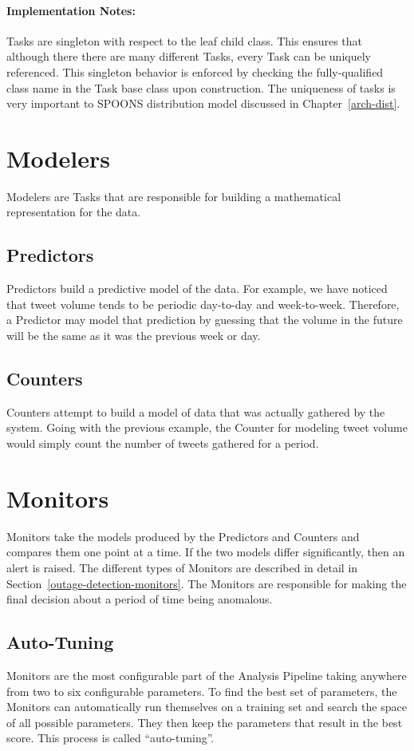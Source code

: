 \documentclass[12pt]{ucthesis}
\begin{document}
\paragraph{Implementation Notes:}
Tasks are singleton with respect to the leaf child class.
This ensures that although there there are many different Tasks, every Task can be uniquely referenced.
This singleton behavior is enforced by checking the fully-qualified class name in the Task base class upon construction.
The uniqueness of tasks is very important to SPOONS distribution model discussed in Chapter~\ref{arch-dist}.

\section{Modelers}
\label{arch-modelers}
Modelers are Tasks that are responsible for building a mathematical representation for the data.

\subsection{Predictors}
\label{arch-predictors}
Predictors build a predictive model of the data. For example, we have noticed that tweet volume tends to be
periodic day-to-day and week-to-week. Therefore, a Predictor may model that prediction by guessing that the volume
in the future will be the same as it was the previous week or day.

\subsection{Counters}
\label{arch-counters}
Counters attempt to build a model of data that was actually gathered by the system. Going with the previous example,
the Counter for modeling tweet volume would simply count the number of tweets gathered for a period.

\section{Monitors}
\label{arch-monitors}
Monitors take the models produced by the Predictors and Counters and compares them one point at a time.
If the two models differ significantly, then an alert is raised.
The different types of Monitors are described in detail in Section~\ref{outage-detection-monitors}.
The Monitors are responsible for making the final decision about a period of time being anomalous.

\subsection{Auto-Tuning}
\label{arch-autotuning}
Monitors are the most configurable part of the Analysis Pipeline taking anywhere from two to six configurable parameters.
To find the best set of parameters, the Monitors can automatically run themselves on a training set and search the space of all possible parameters.
They then keep the parameters that result in the best score.
This process is called ``auto-tuning''.
\end{document}
